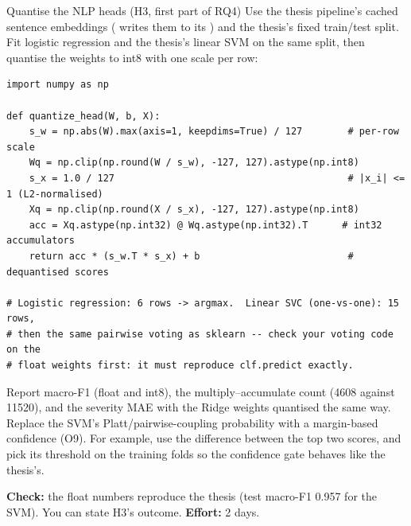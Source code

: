 \begin{stepbox}[label=st:codesign:nlp]{Quantise the NLP heads (H3, first part of RQ4)}
Use the thesis pipeline's cached sentence embeddings (
writes them to its ) and the thesis's fixed train/test split.
Fit logistic regression and the thesis's linear SVM on the same split, then
quantise the weights to int8 with one scale per row:

\begin{lstlisting}[style=py,caption={Post-training int8 quantisation of a linear head.}]
import numpy as np

def quantize_head(W, b, X):
    s_w = np.abs(W).max(axis=1, keepdims=True) / 127        # per-row scale
    Wq = np.clip(np.round(W / s_w), -127, 127).astype(np.int8)
    s_x = 1.0 / 127                                         # |x_i| <= 1 (L2-normalised)
    Xq = np.clip(np.round(X / s_x), -127, 127).astype(np.int8)
    acc = Xq.astype(np.int32) @ Wq.astype(np.int32).T      # int32 accumulators
    return acc * (s_w.T * s_x) + b                          # dequantised scores

# Logistic regression: 6 rows -> argmax.  Linear SVC (one-vs-one): 15 rows,
# then the same pairwise voting as sklearn -- check your voting code on the
# float weights first: it must reproduce clf.predict exactly.
\end{lstlisting}

Report macro-F1 (float and int8), the multiply--accumulate count (\num{4608}
against \num{11520}), and the severity MAE with the Ridge weights quantised the
same way. Replace the SVM's Platt/pairwise-coupling probability with a
margin-based confidence (O9). For example, use the difference between the top
two scores, and pick its threshold on the training folds so the confidence gate
behaves like the thesis's.

\textbf{Check:} the float numbers reproduce the thesis (test macro-F1 0.957 for
the SVM). You can state H3's outcome. \textbf{Effort:} 2 days.
\end{stepbox}

